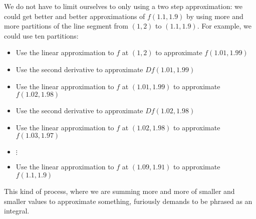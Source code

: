 \documentclass{ximera}
\begin{document}
\begin{question}
  We do not have to limit ourselves to only using a two step approximation:  we could get better and better approximations of $f(1.1,1.9)$
  by using more and more partitions of the line segment from $(1,2)$ to $(1.1,1.9)$.  For example, we could use ten partitions:
  \begin{itemize}
  \item Use the linear approximation to $f$ at $(1,2)$ to approximate $f(1.01,1.99)$
  \item Use the second derivative to approximate $Df(1.01,1.99)$
  \item Use the linear approximation to $f$ at $(1.01,1.99)$ to approximate $f(1.02,1.98)$
  \item Use the second derivative to approximate $Df(1.02,1.98)$
  \item Use the linear approximation to $f$ at $(1.02,1.98)$ to approximate $f(1.03,1.97)$
  \item $\vdots$
  \item  Use the linear approximation to $f$ at $(1.09,1.91)$ to approximate $f(1.1,1.9)$
  \end{itemize}
  
  This kind of process, where we are summing more and more of smaller and smaller values to approximate something, 
  furiously demands to be phrased as an integral.
  

\end{question}
\end{document}
